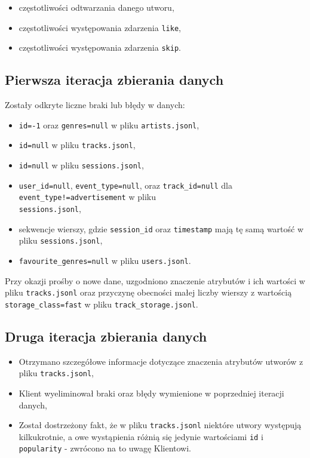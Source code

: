 \documentclass[10pt,a4paper]{article}
\begin{document}
\begin{itemize}

\item częstotliwości odtwarzania danego utworu,
\item częstotliwości występowania zdarzenia \texttt{like},
\item częstotliwości występowania zdarzenia \texttt{skip}.

\end{itemize}

\subsection{Pierwsza iteracja zbierania danych}
Zostały odkryte liczne braki lub błędy w danych:
\begin{itemize}
\item \texttt{id=-1} oraz \texttt{genres=null} w pliku \texttt{artists.jsonl},
\item \texttt{id=null} w pliku \texttt{tracks.jsonl},
\item \texttt{id=null} w pliku \texttt{sessions.jsonl},
\item \texttt{user\_id=null}, \texttt{event\_type=null}, oraz \texttt{track\_id=null} dla \texttt{event\_type!=advertisement} w pliku\\ \texttt{sessions.jsonl},
\item sekwencje wierszy, gdzie \texttt{session\_id} oraz \texttt{timestamp} mają tę samą wartość w pliku \texttt{sessions.jsonl},
\item \texttt{favourite\_genres=null} w pliku \texttt{users.jsonl}.

\end{itemize}

Przy okazji prośby o nowe dane, uzgodniono znaczenie atrybutów i ich wartości w pliku \texttt{tracks.jsonl} oraz przyczynę obecności małej liczby wierszy z wartością \texttt{storage\_class=fast} w pliku \texttt{track\_storage.jsonl}.

\subsection{Druga iteracja zbierania danych}
\begin{itemize}
\item Otrzymano szczegółowe informacje dotyczące znaczenia atrybutów utworów z pliku \texttt{tracks.jsonl},
\item Klient wyeliminował braki oraz błędy wymienione w poprzedniej iteracji danych,
\item Został dostrzeżony fakt, że w pliku \texttt{tracks.jsonl} niektóre utwory występują kilkukrotnie, a owe wystąpienia różnią się jedynie wartościami \texttt{id} i \texttt{popularity} - zwrócono na to uwagę Klientowi.

\end{itemize}
\end{document}

